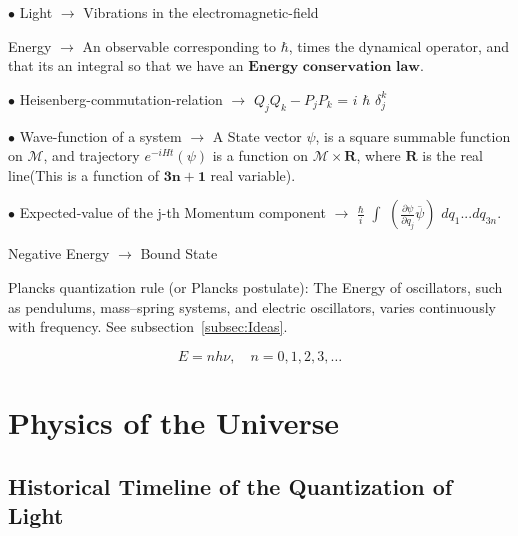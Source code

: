 \documentclass[a4paper, 10pt, onepage]{elegantbook}
\begin{document}
{$\bullet$ Light $\longrightarrow$ Vibrations in the electromagnetic-field  

Energy $\longrightarrow$ An observable corresponding to $\hbar$, times the dynamical operator, and that its an integral
so that we have an $\mathbf{\textbf{Energy conservation law}}$. 
 
$\bullet$ Heisenberg-commutation-relation $\longrightarrow$ ${Q_j}{Q_k} - 
{P_j}{P_k}$ = $i$ $\hbar$ $\delta_j^k$ 
 
$\bullet$ Wave-function of a system $\longrightarrow$ A State vector $\psi$, is a 
square summable function on $\mathscr M$, and
trajectory $e^{-i Ht}(\psi)$ is a function on $\mathscr M \times \mathbf R$, where $\mathbf R$ is the real line(This is 
a function of $\mathbf{3n + 1}$ real variable).  
  
$\bullet$ Expected-value of the j-th Momentum component $\longrightarrow$ $\frac{\hbar}{i}$ 
$\int$ $\left(\frac{\partial \psi}{\partial q_j} \overline {\psi} \right)$ $dq_1...dq_{3n}$.  

Negative Energy $\longrightarrow$ Bound State  

Plancks quantization rule (or Plancks postulate): The Energy of oscillators, such as pendulums, mass--spring systems, and
electric oscillators,
varies continuously with frequency.
See subsection~\ref{subsec:Ideas}.

\[
E = nh\nu, \quad n = 0, 1, 2, 3, \dots
\]

\chapter{Physics of the Universe}

\section{Historical Timeline of the Quantization of Light}

}
\end{document}
